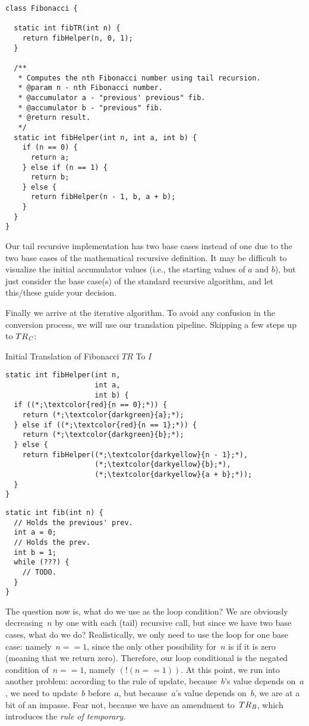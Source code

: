 \begin{lstlisting}[language=MyJava]
class Fibonacci {

  static int fibTR(int n) {
    return fibHelper(n, 0, 1);
  }

  /**
   * Computes the nth Fibonacci number using tail recursion.
   * @param n - nth Fibonacci number.
   * @accumulator a - "previous' previous" fib.
   * @accumulator b - "previous" fib.
   * @return result.
   */
  static int fibHelper(int n, int a, int b) {
    if (n == 0) {
      return a;
    } else if (n == 1) {
      return b;
    } else {
      return fibHelper(n - 1, b, a + b);
    }
  }
}
\end{lstlisting}

Our tail recursive implementation has two base cases instead of one due to the two base cases of the mathematical recursive definition. 
It may be difficult to visualize the initial accumulator values (i.e., the starting values of $a$ and $b$), but just consider the base case(s) of the standard recursive algorithm, and let this/these guide your decision.

Finally we arrive at the iterative algorithm. 
To avoid any confusion in the conversion process, we will use our translation pipeline. 
Skipping a few steps up to $TR_\emph{C}$:

\begin{clrr}[]{Initial Translation of Fibonacci \emph{$TR$} To $I$}
\begin{lstlisting}[language=MyJavaNF]
static int fibHelper(int n, 
                     int a, 
                     int b) {
  if ((*;\textcolor{red}{n == 0};*)) {
    return (*;\textcolor{darkgreen}{a};*);
  } else if ((*;\textcolor{red}{n == 1};*)) {
    return (*;\textcolor{darkgreen}{b};*);
  } else {
    return fibHelper((*;\textcolor{darkyellow}{n - 1};*), 
                     (*;\textcolor{darkyellow}{b};*), 
                     (*;\textcolor{darkyellow}{a + b};*));
  }
}
\end{lstlisting}
\tcblower
\begin{lstlisting}[language=MyJavaNF]
static int fib(int n) {
  // Holds the previous' prev.
  int a = 0;
  // Holds the prev.
  int b = 1;
  while (???) {
    // TODO.
  }
}
\end{lstlisting}
\end{clrr}

The question now is, what do we use as the  loop condition? 
We are obviously decreasing~$n$ by one with each (tail) recursive call, but since we have two base cases, what do we do? 
Realistically, we only need to use the loop for one base case: namely~$n == 1$, since the only other possibility for~$n$ is if it is zero (meaning that we return zero). 
Therefore, our loop conditional is the negated condition of~$n == 1$, namely $(!(n == 1))$. 
At this point, we run into another problem: according to the rule of update, because~$b$'s value depends on~$a$, we need to update~$b$ before~$a$, but because~$a$'s value depends on~$b$, we are at a bit of an impasse. 
Fear not, because we have an amendment to~$TR_\emph{B}$, which introduces the \emph{rule of temporary}.

